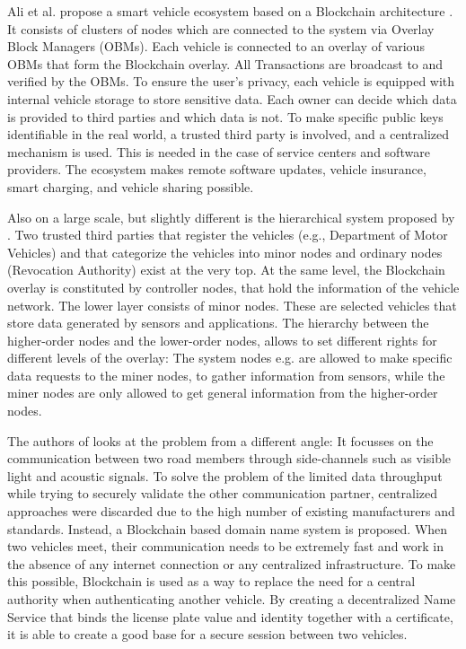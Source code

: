 Ali et al. propose a smart vehicle ecosystem based on a Blockchain architecture \cite{DorriSteger2017}. It consists of clusters of nodes which are connected to the system via Overlay Block Managers (OBMs). Each vehicle is connected to an overlay of various OBMs that form the Blockchain overlay. All Transactions are broadcast to and verified by the OBMs.
To ensure the user's privacy, each vehicle is equipped with internal vehicle storage to store sensitive data. Each owner can decide which data is provided to third parties and which data is not.
To make specific public keys identifiable in the real world, a trusted third party is involved, and a centralized mechanism is used. This is needed in the case of service centers and software providers. The ecosystem makes remote software updates, vehicle insurance, smart charging, and vehicle sharing possible.

Also on a large scale, but slightly different is the hierarchical system proposed by \cite{Sharma2017}. Two trusted third parties that register the vehicles (e.g., Department of Motor Vehicles) and that categorize the vehicles into minor nodes and ordinary nodes (Revocation Authority) exist at the very top. At the same level, the Blockchain overlay is constituted by controller nodes, that hold the information of the vehicle network. The lower layer consists of minor nodes. These are selected vehicles that store data generated by sensors and applications. 
The hierarchy between the higher-order nodes and the lower-order nodes, allows to set different rights for different levels of the overlay: The system nodes e.g. are allowed to make specific data requests to the miner nodes, to gather information from sensors, while the miner nodes are only allowed to get general information from the higher-order nodes.

The authors of \cite{Rowan2017} looks at the problem from a different angle: It focusses on the communication between two road members through side-channels such as visible light and acoustic signals. To solve the problem of the limited data throughput while trying to securely validate the other communication partner, centralized approaches were discarded due to the high number of existing manufacturers and standards. Instead, a Blockchain based domain name system is proposed.
When two vehicles meet, their communication needs to be extremely fast and work in the absence of any internet connection or any centralized infrastructure. 
To make this possible, Blockchain is used as a way to replace the need for a central authority when authenticating another vehicle. By creating a decentralized Name Service that binds the license plate value and identity together with a certificate, it is able to create a good base for a secure session between two vehicles.

